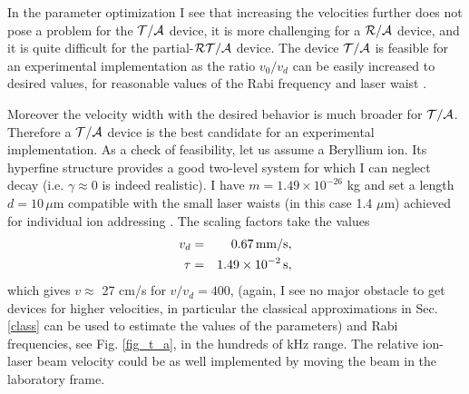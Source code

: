 In the parameter optimization I see that increasing the velocities further does not pose a problem for the ${\cal T/A}$
device, it is more challenging for a ${\cal R/A}$ device, and it is quite difficult for the partial-${\cal RT/A}$ device.  The device ${\cal T/A}$ is feasible for an experimental implementation  as the ratio $v_0/v_d$ can be easily increased to desired values, for  reasonable values of the
Rabi frequency and laser waist \cite{Zeyen2016}.

Moreover the velocity width with the desired behavior is much broader for ${\cal T/A}$. Therefore a ${\cal T/A}$
device is the best candidate for
an experimental implementation.
As a check of feasibility, let us assume a Beryllium ion. Its hyperfine structure provides a good  two-level system
for which I can neglect decay (i.e. $\gamma\approx 0$ is indeed realistic). I have $m=1.49\times 10^{-26}$ kg
and set a length $d=10\, \mu$m compatible with the small laser waists (in this case 1.4 $\mu$m) achieved for individual ion
addressing \cite{Zeyen2016}. The scaling factors take the values
%
\begin{eqnarray}
  v_d&=&0.67\, {\rm mm/s},
  \nonumber\\
  \tau&=&1.49\times 10^{-2}\, {\rm s},
  \nonumber
\end{eqnarray}
%
which gives  $v\approx$ 27 cm/s for $v/v_d=400$, (again, I see no major obstacle to get devices for higher velocities,
in particular the classical approximations in Sec. \ref{class} can be used to  estimate the values of the parameters)
and Rabi frequencies, see Fig. \ref{fig_t_a},  in the hundreds of kHz range. The relative ion-laser beam velocity could be as well
implemented  by moving the beam in the laboratory frame.

%
%
